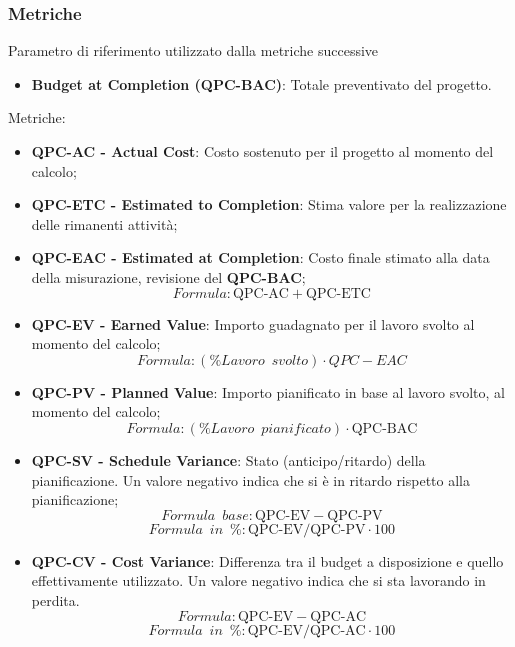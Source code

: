 \subsubsection{Metriche}
Parametro di riferimento utilizzato dalla metriche successive\\
\begin{itemize}
    \item \textbf{Budget at Completion (QPC-BAC)}: Totale preventivato del progetto.
\end{itemize}
Metriche:\\
\begin{itemize}
    \item \textbf{QPC-AC - Actual Cost}: Costo sostenuto per il progetto al momento del calcolo;
    \item \textbf{QPC-ETC - Estimated to Completion}: Stima valore per la realizzazione delle rimanenti attività;
    \item \textbf{QPC-EAC - Estimated at Completion}: Costo finale stimato alla data della misurazione, revisione del \textbf{QPC-BAC}; $$Formula: \textrm{QPC-AC} + \textrm{QPC-ETC}$$
    \item \textbf{QPC-EV - Earned Value}: Importo guadagnato per il lavoro svolto al momento del calcolo; $$Formula: (\%Lavoro \enspace svolto) \cdot QPC-EAC$$
    \item \textbf{QPC-PV - Planned Value}: Importo pianificato in base al lavoro svolto, al momento del calcolo; $$Formula: (\%Lavoro \enspace pianificato) \cdot \textrm{QPC-BAC}$$
    \item \textbf{QPC-SV - Schedule Variance}: Stato (anticipo/ritardo) della pianificazione. Un valore negativo indica che si è in ritardo rispetto alla pianificazione; $$Formula \enspace base: \textrm{QPC-EV} - \textrm{QPC-PV}$$ $$Formula \enspace in \enspace \%: \textrm{QPC-EV} / \textrm{QPC-PV} \cdot 100$$
    \item \textbf{QPC-CV - Cost Variance}: Differenza tra il budget a disposizione e quello effettivamente utilizzato. Un valore negativo indica che si sta lavorando in perdita. $$Formula: \textrm{QPC-EV} - \textrm{QPC-AC}$$ $$Formula \enspace in \enspace \%: \textrm{QPC-EV} / \textrm{QPC-AC} \cdot 100$$
\end{itemize}
